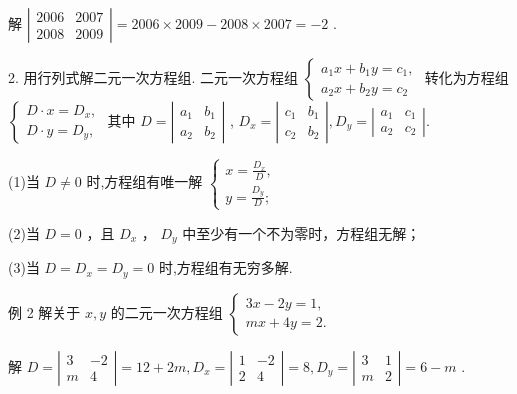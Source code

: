 \documentclass[10pt]{article}
\begin{document}
解 \(\left| \begin{matrix} {2006} & {2007} \\  {2008} & {2009} \end{matrix}\right|  = {2006} \times  {2009} - {2008} \times  {2007} =  - 2\) .

2. 用行列式解二元一次方程组. 二元一次方程组 \(\left\{  \begin{array}{l} {a}_{1}x + {b}_{1}y = {c}_{1}, \\  {a}_{2}x + {b}_{2}y = {c}_{2} \end{array}\right.\) 转化为方程组 \(\left\{  \begin{array}{l} D \cdot  x = {D}_{x}, \\  D \cdot  y = {D}_{y}, \end{array}\right.\) 其中 \(D = \left| \begin{array}{ll} {a}_{1} & {b}_{1} \\  {a}_{2} & {b}_{2} \end{array}\right|\) , \({D}_{x} = \left| \begin{array}{ll} {c}_{1} & {b}_{1} \\  {c}_{2} & {b}_{2} \end{array}\right| ,{D}_{y} = \left| \begin{array}{ll} {a}_{1} & {c}_{1} \\  {a}_{2} & {c}_{2} \end{array}\right| .\)

(1)当 \(D \neq  0\) 时,方程组有唯一解 \(\left\{  \begin{array}{l} x = \frac{{D}_{x}}{D}, \\  y = \frac{{D}_{y}}{D}; \end{array}\right.\)

(2)当 \(D = 0\) ，且 \({D}_{x}\) ， \({D}_{y}\) 中至少有一个不为零时，方程组无解；

(3)当 \(D = {D}_{x} = {D}_{y} = 0\) 时,方程组有无穷多解.

例 2 解关于 \(x,y\) 的二元一次方程组 \(\left\{  \begin{array}{l} {3x} - {2y} = 1, \\  {mx} + {4y} = 2. \end{array}\right.\)

解 \(D = \left| \begin{matrix} 3 &  - 2 \\  m & 4 \end{matrix}\right|  = {12} + {2m},{D}_{x} = \left| \begin{matrix} 1 &  - 2 \\  2 & 4 \end{matrix}\right|  = 8,{D}_{y} = \left| \begin{matrix} 3 & 1 \\  m & 2 \end{matrix}\right|  = 6 - m\) .
\end{document}

